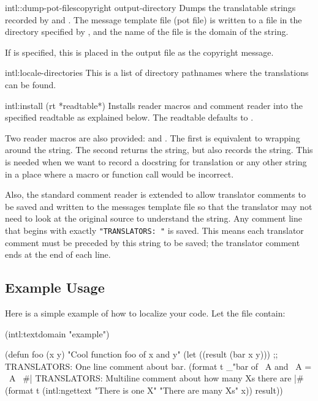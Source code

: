 \begin{defun}{intl::}{dump-pot-files}{\keys copyright
    output-directory}
  Dumps the translatable strings recorded by  and
  .  The message template file (pot file) is written
  to a file in the directory specified by , and
  the name of the file is the domain of the string.

  If  is specified, this is placed in the output file
  as the copyright message.
\end{defun}

\begin{defvar}{intl:}{locale-directories}
  This is a list of directory pathnames where the translations can be found.
\end{defvar}  

\begin{defun}{intl:}{install}{\ampoptional{} (rt *readtable*)}
  Installs reader macros and comment reader into the specified
  readtable as explained below.  The readtable defaults to
  .
\end{defun}

Two reader macros are also provided:  and .  The
first is equivalent to wrapping  around the string.
The second returns the string, but also records the string.  This is
needed when we want to record a docstring for translation or any other
string in a place where a macro or function call would be incorrect.

Also, the standard comment reader is extended to allow translator
comments to be saved and written to the messages template file so that
the translator may not need to look at the original source to
understand the string.  Any comment line that begins with exactly
\verb|"TRANSLATORS: "| is saved.  This means each translator comment
must be preceded by this string to be saved; the translator comment
ends at the end of each line.


\subsection{Example Usage}
\label{sec:localization-usage}

Here is a simple example of how to localize your code.  Let the file
 contain:

\begin{example}

(intl:textdomain "example")  

(defun foo (x y)
  "Cool function foo of x and y"
  (let ((result (bar x y)))
    ;; TRANSLATORS:  One line comment about bar.
    (format t _"bar of ~A and ~A = ~A~%
    #| TRANSLATORS:  Multiline comment about
    how many Xs there are
    |#
    (format t (intl:ngettext "There is one X"
                             "There are many Xs"
                             x))
    result))
\end{example}


